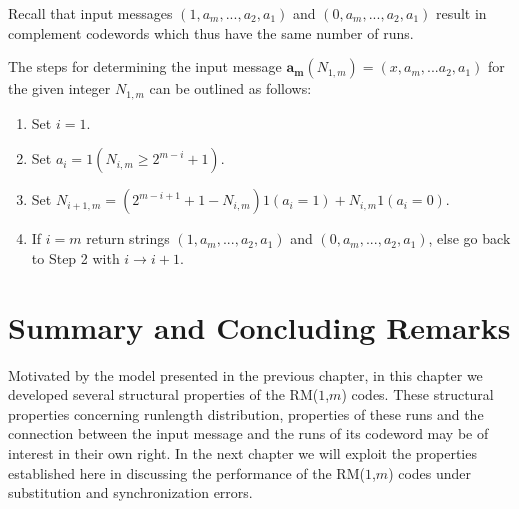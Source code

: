Recall that input messages $(1,a_m,...,a_2,a_1)$ and
$(0,a_m,...,a_2,a_1)$ result in complement codewords which thus have
the same number of runs.

 The steps for determining the input message $\mathbf{a_m}(N_{1,m})=(x,a_m,...a_2,a_1)$ for the given integer $N_{1,m}$ can be
outlined as follows:


\begin{enumerate}
\item Set $i=1$.
\item Set $a_i=1(N_{i,m} \geq 2^{m-i}+1)$.
\item Set $N_{i+1,m}=(2^{m-i+1}+1-N_{i,m})1(a_i=1)+N_{i,m}1(a_i=0)$.
\item If $i=m$ return strings $(1,a_m,...,a_2,a_1)$ and $(0,a_m,...,a_2,a_1)$, else go back to
Step 2 with $i \rightarrow i+1$.
\end{enumerate}

\section{Summary and Concluding Remarks}\label{sectionRMconc}

Motivated by the model presented in the previous chapter, in this
chapter we developed several structural properties of the
RM($1$,$m$) codes. These structural properties concerning runlength
distribution, properties of these runs and the connection between
the input message and the runs of its codeword may be of interest in
their own right. In the next chapter we will exploit the properties
established here in  discussing the performance of the RM($1$,$m$)
codes under substitution and synchronization errors.
